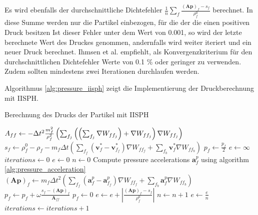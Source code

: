 \documentclass[11pt,
a4paper,
parskip=half, %
BCOR=10mm, %
english,
ngerman]{scrreprt}
\begin{document}
Es wird ebenfalls der durchschnittliche Dichtefehler $\frac{1}{n} \sum_{f} \frac{(\textbf{A}\textbf{p})_f - s_f}{\rho_f^0}$ berechnet.
In diese Summe werden nur die Partikel einbezogen, für die der die einen positiven Druck besitzen
Ist dieser Fehler unter dem Wert von 0.001, so wird der letzte berechnete Wert des Druckes genommen, andernfalls wird weiter iteriert und ein neuer Druck berechnet.
Ihmsen et al. \cite{ihmsen_implicit_2014} empfiehlt, als Konvergenzkriterium für den durchschnittlichen Dichtefehler Werte von 0.1 \% oder geringer zu verwenden.
Zudem sollten mindestens zwei Iterationen durchlaufen werden.

Algorithmus \ref{alg:pressure_iisph} zeigt die Implementierung der Druckberechnung mit IISPH.

\begin{algorithm}
    \caption{Berechnung des Drucks der Partikel mit IISPH}
    \label{alg:pressure_iisph}
    \begin{algorithmic}[1]
            \State $A_{ff} \gets - \Delta t^2 \frac{m_f^2}{\rho_f^2} \left(\sum_{f_j} \left(\Bigl(\sum_{f_j} \nabla W_{ff_j}\Bigr) + \nabla W_{ff_j}\right) \nabla W_{ff_j}\right)$
            \State $s_f \gets \rho_f^0 - \rho_f - m_f \Delta t \left(\sum_{f_f}(\textbf{v}_f^* - \textbf{v}_{f_f}^*) \nabla W_{ff_f} + \sum_{f_b}\textbf{v}_f^* \nabla W_{ff_b}\right)$
            \State $p_f \gets \frac{p_f}{2}$
        \EndFor
         \State $e \gets \infty$
         \State $iterations \gets 0$
            \State $e \gets 0$
            \State $n \gets 0$
            \State Compute pressure accelerations $\textbf{a}_f^p$ using algorithm \ref{alg:pressure_acceleration}
                \State $(\textbf{A}\textbf{p})_f \gets m_f \Delta t^2\left(\sum_{f_f}(\textbf{a}_f^p - \textbf{a}_{f_f}^p) \nabla W_{ff_f} + \sum_{f_b}\textbf{a}_f^p \nabla W_{ff_b}\right)$
                    \State $p_f \gets p_f + \omega \frac{s_f - (\textbf{A}\textbf{p})_f}{\textbf{A}_{ff}}$
                        \State $p_f \gets 0$
                    \Else
                        \State $e \gets e + \left\vert\frac{(\textbf{A}\textbf{p})_f - s_f}{\rho_f^0} \right\vert$
                        \State $n \gets n + 1$
                    \EndIf
                \EndIf
            \EndFor
            \State $e \gets \frac{e}{n}$
            \State $iterations \gets iterations + 1$
        \EndWhile
    \end{algorithmic}
    \end{algorithm}
\end{document}
